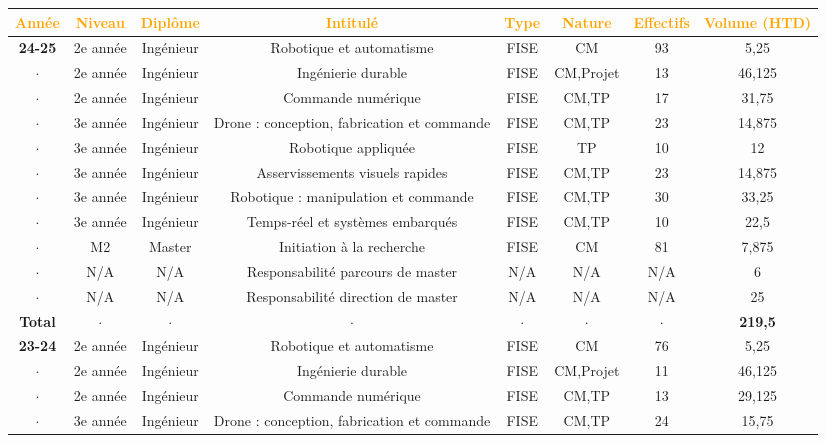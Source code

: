 \documentclass[a4paper,12pt]{article}
\begin{document}
{\centering
\setlength{\tabcolsep}{2pt} %

\begin{tabular}{cccccccc} \toprule
    \textcolor{orange}{Année} & \textcolor{orange}{Niveau} & \textcolor{orange}{Diplôme} & \textcolor{orange}{Intitulé} & \textcolor{orange}{Type} & \textcolor{orange}{Nature} & \textcolor{orange}{Effectifs} & \textcolor{orange}{Volume (HTD)} \\ \midrule
 \bf{24-25} & 2e année  & Ingénieur & Robotique et automatisme & FISE & CM & 93 & 5,25 \\
 $\cdot$ & 2e année  & Ingénieur & Ingénierie durable  & FISE & CM,Projet & 13  & 46,125  \\
  $\cdot$ & 2e année  & Ingénieur & Commande numérique  & FISE & CM,TP & 17  & 31,75  \\
  $\cdot$ & 3e année  & Ingénieur & Drone : conception, fabrication et commande & FISE & CM,TP & 23 & 14,875  \\
  $\cdot$ & 3e année  & Ingénieur & Robotique appliquée  & FISE & TP & 10  & 12  \\
  $\cdot$ & 3e année  & Ingénieur & Asservissements visuels rapides & FISE & CM,TP & 23 & 14,875  \\
  $\cdot$ & 3e année  & Ingénieur & Robotique : manipulation et commande & FISE & CM,TP & 30 & 33,25  \\
  $\cdot$ & 3e année  & Ingénieur & Temps-réel et systèmes embarqués & FISE & CM,TP & 10 & 22,5  \\
  $\cdot$ & M2        & Master    & Initiation à la recherche & FISE & CM & 81 & 7,875  \\
  $\cdot$ & N/A       & N/A       & Responsabilité parcours de master & N/A & N/A & N/A & 6  \\
  $\cdot$ & N/A       & N/A       & Responsabilité direction de master & N/A & N/A & N/A & 25  \\ 
 \bf{Total} & $\cdot$ & $\cdot$ & $\cdot$ & $\cdot$ & $\cdot$ & $\cdot$ &  {\bf 219,5} \\\midrule
  \bf{23-24} & 2e année  & Ingénieur & Robotique et automatisme & FISE & CM & 76 & 5,25 \\
 $\cdot$ & 2e année  & Ingénieur & Ingénierie durable  & FISE & CM,Projet & 11  & 46,125  \\
  $\cdot$ & 2e année  & Ingénieur & Commande numérique  & FISE & CM,TP & 13  & 29,125  \\
  $\cdot$ & 3e année  & Ingénieur & Drone : conception, fabrication et commande & FISE & CM,TP & 24 & 15,75  \\

\end{tabular}}
\end{document}

